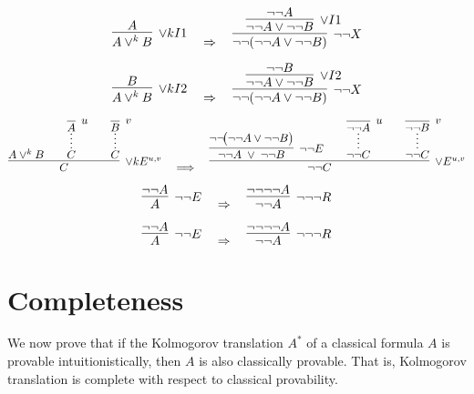 \documentclass{article}
\begin{document}
\vspace{3em}
\[
\infer[\lor kI1]{A \lor^k B}{A}
\quad \Rightarrow \quad
\infer[\neg \neg X]{\neg \neg(\neg \neg A \lor \neg \neg B)}{
    \infer[\lor I1]{\neg \neg A \lor \neg \neg B}{\neg \neg A
        \infer[]{}{}
    }
}
\]

\vspace{3em}
\[
\infer[\lor kI2]{A \lor^k B}{B}
\quad \Rightarrow \quad
\infer[\neg \neg X]{\neg \neg(\neg \neg A \lor \neg \neg B)}{
    \infer[\lor I2]{\neg \neg A \lor \neg \neg B}{\neg \neg B
        \infer[]{}{}
    }
}
\]


\vspace{3em}
\[
\infer[\lor kE^{u,v}]{C}{
    {A \lor^{k} B}
    \hspace{2em}
    \infer*[]{C}{\infer[u]{A}{}}
    \hspace{2em}
    \infer*[]{C}{\infer[v]{B}{}}
}
\quad\Longrightarrow\quad
\infer[\lor E^{u,v}]{\neg\neg C}{
    \infer[\neg\neg E]{\neg\neg A \;\lor\; \neg\neg B}{
        \neg\neg\!\bigl(\neg\neg A \lor \neg\neg B\bigr)}
    \hspace{2em}
    \infer*[]{\neg\neg C}{
        \infer[u]{\neg\neg A}{}}
    \hspace{2em}
    \infer*[]{\neg\neg C}{
        \infer[v]{\neg\neg B}{}}
}
\]





\vspace{3em}
\[
\infer[\neg\neg E]{A}{
    \neg\neg A
}
\quad \Rightarrow \quad
\infer[\neg\neg\neg R]{\neg \neg A}{
    \neg\neg\neg\neg A
}
\]

\vspace{3em}
\[
\infer[\neg\neg E]{A}{
    \neg\neg A
}
\quad \Rightarrow \quad
\infer[\neg\neg\neg R]{\neg \neg A}{
    \neg\neg\neg\neg A
}
\]



















\section{Completeness}

We now prove that if the Kolmogorov translation $A^*$ of a classical formula $A$ is provable intuitionistically, then $A$ is also classically provable. That is, Kolmogorov translation is complete with respect to classical provability.
\end{document}
